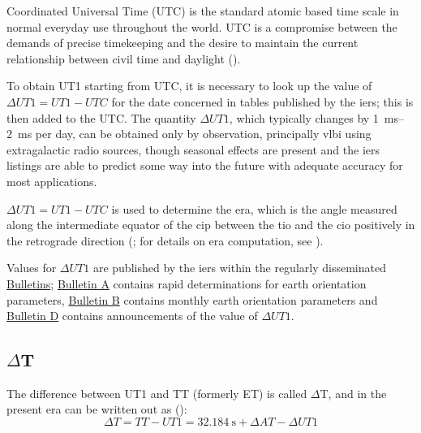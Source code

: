 Coordinated Universal Time (UTC) is the standard atomic based time scale in normal 
everyday use throughout the world. UTC is a compromise between the demands of 
precise timekeeping and the desire to maintain the current relationship between 
civil time and daylight (\cite{sofa_18161_tscb}).

To obtain UT1 starting from UTC, it is necessary to look up the value of 
\( \Delta UT1 = UT1 - UTC \) for the date concerned in tables published by the 
\gls{iers}; this is then added to the UTC. The quantity \(\Delta UT1\), which 
typically changes by \SIrange{1}{2}{\milli\second} per day, can be obtained only 
by observation, principally \gls{vlbi} using extragalactic radio sources, though seasonal effects 
are present and the \gls{iers} listings are able to predict some way into the future 
with adequate accuracy for most applications.

\( \Delta UT1 = UT1 - UTC \) is used to determine the \gls{era}, which is the 
angle measured along the intermediate equator of the \gls{cip} between the \gls{tio} and the 
\gls{cio} positively in the retrograde direction (\cite{IersBulABC04}; for details on 
\gls{era} computation, see \cite{iers2010}).

Values for \( \Delta UT1 \) are published by the \gls{iers} within the regularly disseminated 
\href{https://www.iers.org/IERS/EN/Publications/Bulletins/bulletins.html}{Bulletins}; 
\href{https://datacenter.iers.org/productMetadata.php?id=6}{Bulletin A} contains 
rapid determinations for earth orientation parameters, 
\href{https://datacenter.iers.org/productMetadata.php?id=207}{Bulletin B} 
contains monthly earth orientation parameters and 
\href{https://datacenter.iers.org/productMetadata.php?id=17}{Bulletin D} contains 
announcements of the value of \( \Delta UT1 \).

\subsection{$\Delta$T}
The difference between UT1 and TT (formerly ET) is called $\Delta$T, and in the 
present era can be written out as (\cite{sofa_18161_tscb}):
\begin{equation}
  \Delta T = TT - UT1 = \SI{32.184}{\second} + \Delta AT - \Delta UT1
\end{equation}
